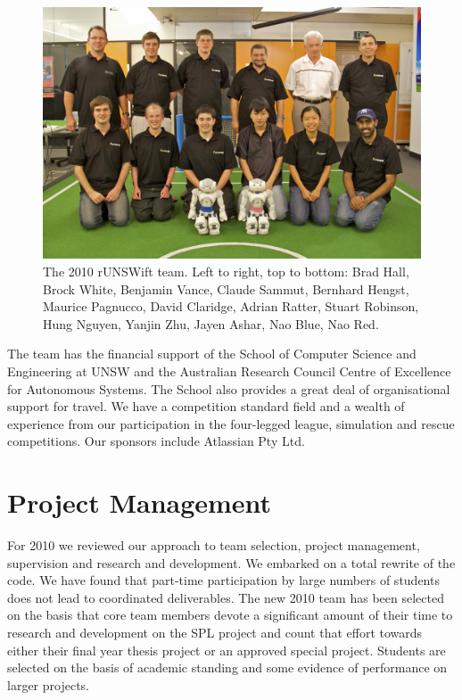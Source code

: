 \documentclass[pdftex,11pt,a4paper]{report}
\begin{document}
\begin{figure} [ht]
\centering
\includegraphics[width=1.0\textwidth]{figures/TeamPic.jpg}
\caption{The 2010 rUNSWift team. Left to right, top to bottom: Brad Hall, Brock White, Benjamin Vance, Claude Sammut, Bernhard Hengst, Maurice Pagnucco, David Claridge, Adrian Ratter, Stuart Robinson, Hung Nguyen, Yanjin Zhu, Jayen Ashar, Nao Blue, Nao Red.} \label{fig-team}
\end{figure}

The team has the financial support of the School of Computer Science and Engineering at UNSW and the Australian Research Council Centre of Excellence for Autonomous Systems.  The School also provides a great deal of organisational support for travel. We have a competition standard field and a wealth of experience from our participation in the four-legged league, simulation and rescue competitions. Our sponsors include Atlassian Pty Ltd.

\section{Project Management}

For 2010 we reviewed our approach to team selection, project management, supervision and research and development. We embarked on a total rewrite of the code. We have found that part-time participation by large numbers of students does not lead to coordinated deliverables. The new 2010 team has been selected on the basis that core team members devote a significant amount of their time to research and development on the SPL project and count that effort towards either their final year thesis project or an approved special project. Students are selected on the basis of academic standing and some evidence of performance on larger projects. 
\end{document}
